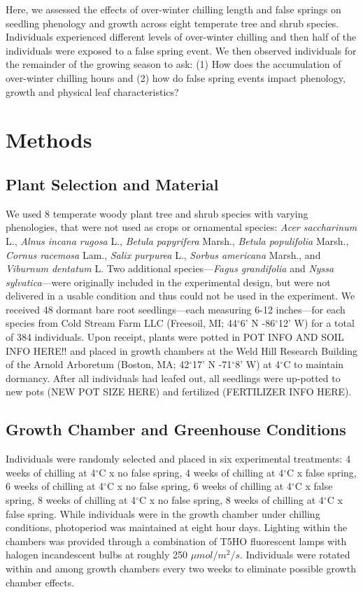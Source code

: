 \documentclass{article}\usepackage[]{graphicx}\usepackage[]{color}
\begin{document}
Here, we assessed the effects of over-winter chilling length and false springs on seedling phenology and growth across eight temperate tree and shrub species. Individuals experienced different levels of over-winter chilling and then half of the individuals were exposed to a false spring event. We then observed individuals for the remainder of the growing season to ask: (1) How does the accumulation of over-winter chilling hours and (2) how do false spring events impact phenology, growth and physical leaf characteristics?

\section*{Methods}
\subsection*{Plant Selection and Material}
We used 8 temperate woody plant tree and shrub species with varying phenologies, that were not used as crops or ornamental species: \textit{Acer saccharinum} L., \textit{Alnus incana rugosa} L., \textit{Betula papyrifera} Marsh., \textit{Betula populifolia} Marsh., \textit{Cornus racemosa} Lam., \textit{Salix purpurea} L., \textit{Sorbus americana} Marsh., and \textit{Viburnum dentatum} L. Two additional species---\textit{Fagus grandifolia} and \textit{Nyssa sylvatica}---were originally included in the experimental design, but were not delivered in a usable condition and thus could not be used in the experiment. We received 48 dormant bare root seedlings---each measuring 6-12 inches---for each species from Cold Stream Farm LLC (Freesoil, MI; 44$^{\circ}$6' N -86$^{\circ}$12' W) for a total of 384 individuals. Upon receipt, plants were potted in POT INFO AND SOIL INFO HERE!! and placed in growth chambers at the Weld Hill Research Building of the Arnold Arboretum (Boston, MA; 42$^{\circ}$17' N -71$^{\circ}$8' W) at 4$^{\circ}$C to maintain dormancy. After all individuals had leafed out, all seedlings were up-potted to new pots (NEW POT SIZE HERE) and fertilized (FERTILIZER INFO HERE).

\subsection*{Growth Chamber and Greenhouse Conditions}
Individuals were randomly selected and placed in six experimental treatments: 4 weeks of chilling at 4$^{\circ}$C x no false spring, 4 weeks of chilling at 4$^{\circ}$C x false spring, 6 weeks of chilling at 4$^{\circ}$C x no false spring, 6 weeks of chilling at 4$^{\circ}$C x false spring,
8 weeks of chilling at 4$^{\circ}$C x no false spring, 8 weeks of chilling at 4$^{\circ}$C x false spring. While individuals were in the growth chamber under chilling conditions, photoperiod was maintained at eight hour days. Lighting within the chambers was provided through a combination of T5HO fluorescent lamps with halogen incandescent bulbs at roughly 250 $\mu mol/m^{2}/s$. Individuals were rotated within and among growth chambers every two weeks to eliminate possible growth chamber effects.
\end{document}
